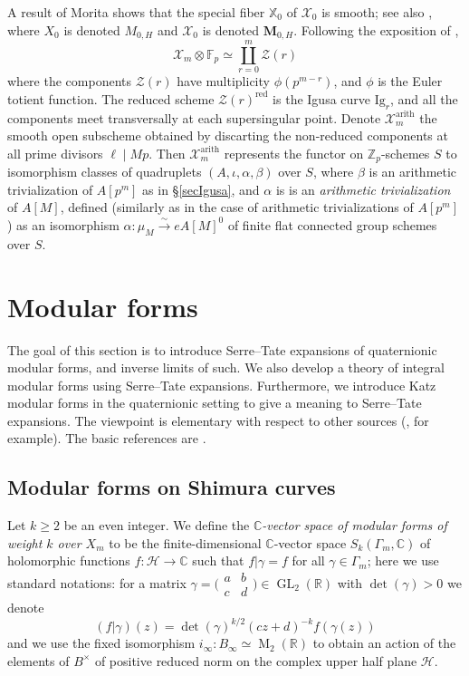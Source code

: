 \documentclass[a4paper,11pt]{amsart}
\numberwithin{equation}{section}
\theoremstyle{plain}
\theoremstyle{definition}
\theoremstyle{remark}
\newcommand{\Z}{\mathbb{Z}}
\newcommand{\R}{\mathbb{R}}
\newcommand{\C}{\mathbb{C}}
\newcommand{\F}{\mathbb{F}}
\newcommand{\X}{\mathbb{X}}
\DeclareMathOperator{\GL}{GL}
\DeclareMathOperator{\M}{M}
\newcommand{\smallmat}[4]{\bigl(\begin{smallmatrix}#1&#2\\#3&#4\end{smallmatrix}\bigr)}
\begin{document}
A result of Morita \cite{Morita} shows that the special fiber $\X_0$ of $\mathcal{X}_0$ is smooth; 
see also \cite[\S6.1]{Carayol-Shimura}, where $X_0$ is denoted $M_{0,H}$ and $\mathcal{X}_0$ is 
denoted $\boldsymbol{M}_{0,H}$. 
Following the exposition of \cite[\S1.1]{Mori1},
\[\mathcal{X}_m\otimes\F_p\simeq\coprod_{r=0}^m\mathcal{Z}(r)\]
where the components $\mathcal{Z}(r)$ have multiplicity $\phi(p^{m-r})$, and $\phi$ is the Euler totient function. 
The reduced scheme $\mathcal{Z}(r)^\mathrm{red}$ is the Igusa curve 
$\mathrm{Ig}_r$, and all the components meet transversally at each supersingular point. 
Denote $\mathcal{X}_m^\mathrm{arith}$ the smooth open subscheme obtained by discarting the non-reduced components at all prime divisors $\ell\mid Mp$. Then 
$\mathcal{X}_m^\mathrm{arith}$ represents the functor on 
$\Z_p$-schemes $S$ to isomorphism classes of quadruplets $(A,\iota,\alpha,\beta)$ 
over $S$,
where $\beta$ is an arithmetic trivialization of $A[p^m]$ as in \S\ref{secIgusa}, 
and $\alpha$ is is an \emph{arithmetic trivialization} of $A[M]$, 
defined (similarly as in the case of arithmetic trivializations of $A[p^m]$) as an isomorphism 
$\alpha\colon{\mu}_{M} \overset\sim\rightarrow eA[M]^0$ 
of finite flat connected group schemes over $S$. 

\section{Modular forms}\label{secmodforms}
The goal of this section is to introduce Serre--Tate expansions of quaternionic modular forms, and inverse limits of such. We also develop a theory of integral modular forms using Serre--Tate expansions. Furthermore, we introduce Katz modular forms in the quaternionic setting to give a meaning to Serre--Tate expansions. The viewpoint is elementary with respect to other sources (\cite{CHJ}, for example). The basic references are \cite{Brasca-Eigen2, Burungale, Mori2, Mori, Mori1, Brooks, Ohta-ES}. 

\subsection{Modular forms on Shimura curves}\label{sec.modforms}
Let $k\geq 2$ be an even integer. 
We define the \emph{$\C$-vector space of modular forms of weight $k$ over $X_m$} to be the finite-dimensional $\C$-vector space $S_k(\Gamma_m,\C)$ of holomorphic functions $f\colon\mathcal{H}\rightarrow\C$ such that $f|\gamma=f$ for all $\gamma\in \Gamma_m$; here we use standard notations: for a matrix $\gamma=\smallmat abcd\in\GL_2(\R)$ with $\det(\gamma)>0$ we denote
\begin{equation}\label{MFhol}
(f|\gamma)(z)=\det(\gamma)^{k/2}(cz+d)^{-k}f(\gamma(z))
\end{equation}
and we use the fixed isomorphism $i_\infty:B_\infty\simeq\M_2(\R)$ 
to obtain an action of the elements of $B^\times$ of positive reduced norm on the complex upper half plane $\mathcal{H}$. 
\end{document}
